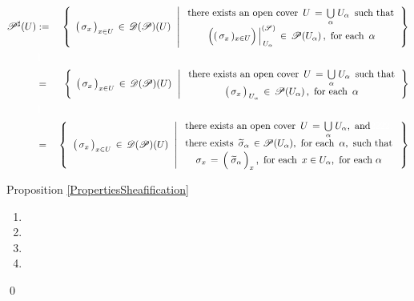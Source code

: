 \vskip 0.5cm
\begin{remark}
\mbox{}\vskip 0.1cm
\noindent
\begin{eqnarray*}
\mathscr{P}^{\sharp}(U)
& := &
	\left\{\;\,
		\left(\,\overset{{\color{white}.}}{\sigma_{x}}\,\right)_{x \in U} \,\in\, \mathscr{D}(\mathscr{P})(U)
		\,\;\left\vert\;
			\begin{array}{c}
			\textnormal{there exists an open cover \,$U \,=\, \underset{\alpha}{\bigcup}\;U_{\alpha}$\, such that}
			\\
			\textnormal{$\left.\left(\overset{{\color{white}.}}{(\,\sigma_{x}\,)_{x \in U}}\right)\,\right\vert^{(\mathscr{S})}_{\,U_{\alpha}} \,\in\, \mathscr{P}(U_{\alpha})$\,,\, for each \,$\alpha$}
			\end{array}
			\right.
		\right\}
\\ & {\color{white}\textnormal{\large$1$}} &
\\
& = &
	\left\{\;\,
		\left(\,\overset{{\color{white}.}}{\sigma_{x}}\,\right)_{x \in U} \,\in\, \mathscr{D}(\mathscr{P})(U)
		\,\;\left\vert\;
			\begin{array}{c}
			\textnormal{there exists an open cover \,$U \,=\, \underset{\alpha}{\bigcup}\;U_{\alpha}$\, such that}
			\\
			\textnormal{$\left(\,\overset{{\color{white}.}}{\sigma_{x}}\,\right)_{\,U_{\alpha}} \,\in\, \mathscr{P}(U_{\alpha})$\,,\, for each \,$\alpha$}
			\end{array}
			\right.
		\right\}
\\ & {\color{white}\textnormal{\large$1$}} &
\\
& = &
	\left\{\;\;
		\left(\,\overset{{\color{white}.}}{\sigma_{x}}\,\right)_{x \in U} \,\in\, \mathscr{D}(\mathscr{P})(U)
		\;\,\left\vert\;
			\begin{array}{c}
			\textnormal{there exists an open cover \,$U \,=\, \underset{\alpha}{\bigcup}\;U_{\alpha}$,\, and{\color{white}2222.}}
			\\
			\textnormal{there exists \,$\widetilde{\sigma}_{\alpha} \,\in \mathscr{P}(U_{\alpha})$,\, for each \,$\alpha$,\, such that}
			\\
			\textnormal{$\overset{{\color{white}\textnormal{\normalsize$1$}}}{\sigma_{x}} \,=\, \left(\;\overset{{\color{white}.}}{\widetilde{\sigma}_{\alpha}}\,\right)_{x}$\,,\, for each \,$x \in U_{\alpha}$,\, for each $\alpha$}
			\end{array}
			\right.
		\,\right\}
\end{eqnarray*}
\end{remark}


\vskip 0.5cm
\proofof Proposition \ref{PropertiesSheafification}
\begin{enumerate}
\item
\item
\item
\item
\end{enumerate}
\qed

